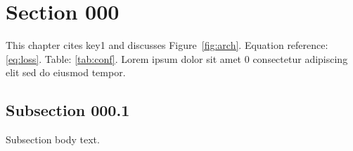 \section{Section 000}\label{sec:s0}
This chapter cites key1 and discusses Figure~\ref{fig:arch}.
Equation reference: \eqref{eq:loss}. Table: \ref{tab:conf}.
Lorem ipsum dolor sit amet 0 consectetur adipiscing elit sed do eiusmod tempor.
\subsection{Subsection 000.1}\label{sec:s0sub}
Subsection body text.
